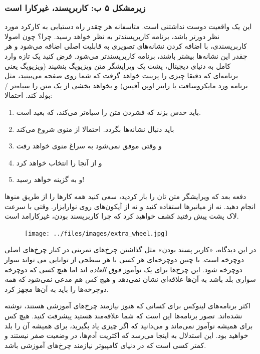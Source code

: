 \subsubsection*{زیرمشکل ۵ ب: کاربرپسند، غیرکارا است}
این یک واقعیت دوست نداشتنی است. متاسفانه هر چقدر راه دستیابی به کارکرد مورد نظر دورتر باشد، برنامه کاربرپسندتر به نظر خواهد رسید. چرا؟ چون اصولا کاربرپسندی، با اضافه کردن نشانه‌های تصویری به قابلیت اصلی اضافه می‌شود و هر چقدر این نشانه‌ها بیشتر باشند، برنامه کاربرپسندتر می‌شود. فرض کنید یک تازه وارد کامل به دنیای دیجیتال، پشت یک ویرایشگر متن ویزیویگ بنشیند (ویزیویگ یعنی برنامه‌ای که دقیقا چیزی را پرینت خواهد گرفت که شما روی صفحه می‌بینید، مثل برنامه ورد مایکروسافت یا رایتر اوپن آفیس) و بخواهد بخشی از یک متن را سیاه‌تر / بولد کند. احتمالا:
\begin{enumerate}
	\item باید حدس بزند که فشردن 
 متن را سیاه‌تر می‌کند، که بعید است.
	\item باید دنبال نشانه‌ها بگردد. احتمالا از منوی 
 شروع می‌کند
 	\item  و وقتی موفق نمی‌شود به سراغ منوی 
 خواهد رفت
 	\item  و از آنجا 
 را انتخاب خواهد کرد
 	\item و به گزینه 
 خواهد رسید!
\end{enumerate}
دفعه بعد که ویرایشگر متن تان را باز کردید، سعی کنید همه کارها را از طریق منوها انجام دهید. نه از میانبرها استفاده کنید و نه از آیکون‌های روی نوارابزار. وقتی با سرعت لاک پشت پیش رفتید کشف خواهید کرد که چرا کاربرپسند بودن، غیرکارامد است.
\newpage
\begin{figure}
	\begin{center}
		\texttt{[image: ../files/images/extra\_wheel.jpg]}
	\end{center}
\end{figure}

در این دیدگاه، «کاربر پسند بودن» مثل گذاشتن چرخ‌های تمرینی در کنار چرخ‌های اصلی دوچرخه است. با چنین دوچرخه‌ای هر کسی با هر سطحی از توانایی می تواند سوار دوچرخه شود. این چرخ‌ها برای یک نوآموز
\emph{فوق العاده}
اند اما هیچ کسی که دوچرخه سواری بلد باشد به آن‌ها علاقه‌ای نشان نمی‌دهد و هیچ کس هم مدعی نمی‌شود که
\emph{همه}
دوچرخه‌ها را باید به آن‌ها مجهز کرد.

اکثر برنامه‌های لینوکس برای کسانی که هنوز نیازمند چرخ‌های آموزشی هستند، نوشته نشده‌اند. تصور برنامه‌ها این است که شما علاقه‌مند هستید پیشرفت کنید. هیچ کس برای همیشه نوآموز نمی‌ماند و می‌دانید که اگر چیزی یاد بگیرید، برای همیشه آن را بلد خواهید بود. این استدلال به اینجا می‌رسد که اکثریت آدم‌ها، در وضعیت صفر نیستند و کمتر کسی است که در دنیای کامپیوتر نیازمند چرخ‌های آموزشی باشد.

